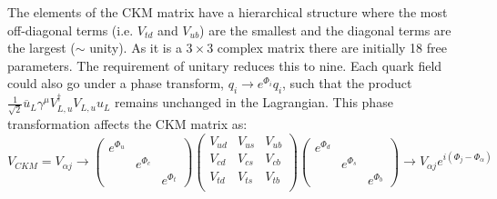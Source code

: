 The elements of the CKM matrix have a hierarchical structure where the most off-diagonal terms (i.e. $V_{td}$ and $V_{ub}$) are the smallest and the diagonal terms are the largest ($\sim$ unity). As it is a $3\times3$ complex matrix there are initially 18 free parameters. The requirement of unitary reduces this to nine.
Each quark field could also go under a phase transform, $q_{i}\to e^{\Phi_{i}}q_{i}$, such that the product  $\frac{1}{\sqrt{2}}\overline{u}_{L}\gamma^{\mu}V^{\dagger}_{L,u}V_{L,u}u_{L}$ remains unchanged in the Lagrangian. This phase transformation affects the CKM matrix as:
\begin{equation}
  V_{CKM} = V_{\alpha j} \to \begin{pmatrix}e^{\Phi_{u}}&&\\&e^{\Phi_{c}}&\\&&e^{\Phi_{t}}\end{pmatrix}\begin{pmatrix}V_{ud}&V_{us}&V_{ub}\\V_{cd}&V_{cs}&V_{cb}\\V_{td}&V_{ts}&V_{tb}\\\end{pmatrix} \begin{pmatrix}e^{\Phi_{d}}&&\\&e^{\Phi_{s}}&\\&&e^{\Phi_{b}}\end{pmatrix} \to V_{\alpha j}e^{i(\Phi_{j} - \Phi_{\alpha})}
\end{equation}

